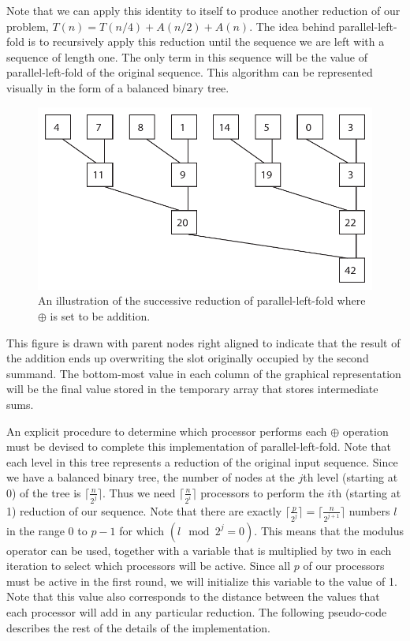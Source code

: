 \documentclass[12pt,twoside]{reedthesis}
\begin{document}
Note that we can apply this identity to itself to produce another
reduction of our problem, $T(n) = T(n/4) + A(n/2) + A(n)$. The idea
behind parallel-left-fold is to recursively apply this reduction until
the sequence we are left with a sequence of length one. The only term
in this sequence will be the value of parallel-left-fold of the
original sequence. This algorithm can be represented visually in the
form of a balanced binary tree.

\begin{figure}[h]
\includegraphics{parallel-left-fold-tree.pdf}
\caption{An illustration of the successive reduction of
  parallel-left-fold where $\oplus$ is set to be addition.}
\end{figure}
\vspace{1pc}

This figure is drawn with parent nodes right aligned to indicate that
the result of the addition ends up overwriting the slot originally
occupied by the second summand. The bottom-most value in each column
of the graphical representation will be the final value stored in the
temporary array that stores intermediate sums.

An explicit procedure to determine which processor performs each
$\oplus$ operation must be devised to complete this implementation of
parallel-left-fold. Note that each level in this tree represents a reduction of the original input
sequence. Since we have a balanced binary tree, the number of nodes at
the $j$th level (starting at 0) of the tree is  $\lceil \frac{n}{2^j}
\rceil$. Thus we need $\lceil \frac{n}{2^i}\rceil$ processors to
perform the $i$th (starting at 1) reduction of our sequence.
Note that there are exactly $\lceil \frac{p}{2^j} \rceil = \lceil
\frac{n}{2^{j+1}} \rceil$ numbers $l$ in the range 0 to $p-1$ for
which $(l \mod 2^j = 0)$. This means that the modulus operator can be
used, together with a variable that is multiplied by two in each
iteration to select which processors will be active. Since all $p$ of
our processors must be active in the first round, we will initialize
this variable to the value of 1. Note that this value also corresponds
to the distance between the values that each processor will add in any
particular reduction. The following pseudo-code describes the rest of
the details of the implementation.
\end{document}

